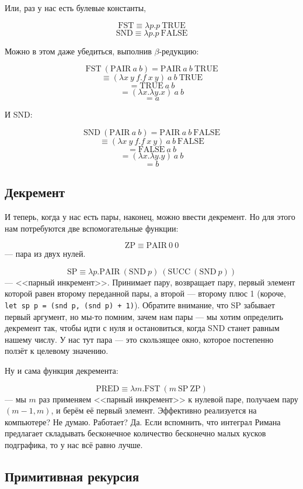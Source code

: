 \documentclass[a5paper]{article}
\begin{document}
Или, раз у нас есть булевые константы,

$$\mbox{FST} \equiv \lambda p.p\ \mbox{TRUE}$$
$$\mbox{SND} \equiv \lambda p.p\ \mbox{FALSE}$$

Можно в этом даже убедиться, выполнив $\beta$-редукцию: 

$$\mbox{FST}\ (\mbox{PAIR}\ a\ b) = \mbox{PAIR}\ a\ b\ \mbox{TRUE}$$
$$\equiv (\lambda x\ y\ f.f\ x\ y)\ a\ b\ \mbox{TRUE}$$
$$= \mbox{TRUE}\ a\ b$$
$$= (\lambda x.\lambda y.x)\ a\ b$$
$$= a$$

И SND:

$$\mbox{SND}\ (\mbox{PAIR}\ a\ b) = \mbox{PAIR}\ a\ b\ \mbox{FALSE}$$
$$\equiv (\lambda x\ y\ f.f\ x\ y)\ a\ b\ \mbox{FALSE}$$
$$= \mbox{FALSE}\ a\ b$$
$$= (\lambda x.\lambda y.y)\ a\ b$$
$$= b$$

\subsection{Декремент}

И теперь, когда у нас есть пары, наконец, можно ввести декремент. Но для этого нам потребуются две вспомогательные функции:

$$\mbox{ZP} \equiv \mbox{PAIR}\ 0\ 0$$ 
--- пара из двух нулей.

$$\mbox{SP} \equiv \lambda p.\mbox{PAIR}\ (\mbox{SND}\ p)\ (\mbox{SUCC}\ (\mbox{SND}\ p))$$
--- <<парный инкремент>>. Принимает пару, возвращает пару, первый элемент которой равен второму переданной пары, а второй --- второму плюс 1 (короче, \texttt{let sp p = (snd p, (snd p) + 1)}). Обратите внимание, что SP забывает первый аргумент, но мы-то помним, зачем нам пары --- мы хотим определить декремент так, чтобы идти с нуля и остановиться, когда SND станет равным нашему числу. У нас тут пара --- это скользящее окно, которое постепенно ползёт к целевому значению.

Ну и сама функция декремента:

$$\mbox{PRED} \equiv \lambda m.\mbox{FST}\ (m\ \mbox{SP}\ \mbox{ZP})$$
--- мы $m$ раз применяем <<парный инкремент>> к нулевой паре, получаем пару $(m - 1, m)$, и берём её первый элемент. Эффективно реализуется на компьютере? Не думаю. Работает? Да. Если вспомнить, что интеграл Римана предлагает складывать бесконечное количество бесконечно малых кусков подграфика, то у нас всё равно лучше.

\subsection{Примитивная рекурсия}
\end{document}
